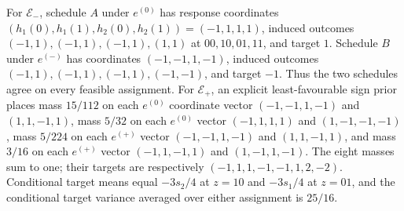 For \(\mathcal E_-\), schedule \(A\) under \(e^{(0)}\) has response coordinates \((h_{1}(0),h_{1}(1),h_{2}(0),h_{2}(1))=(-1,1,1,1)\), induced outcomes \((-1,1),(-1,1),(-1,1),(1,1)\) at \(00,10,01,11\), and target \(1\). Schedule \(B\) under \(e^{(-)}\) has coordinates \((-1,-1,1,-1)\), induced outcomes \((-1,1),(-1,1),(-1,1),(-1,-1)\), and target \(-1\). Thus the two schedules agree on every feasible assignment. For \(\mathcal E_+\), an explicit least-favourable sign prior places mass \(15/112\) on each \(e^{(0)}\) coordinate vector \((-1,-1,1,-1)\) and \((1,1,-1,1)\), mass \(5/32\) on each \(e^{(0)}\) vector \((-1,1,1,1)\) and \((1,-1,-1,-1)\), mass \(5/224\) on each \(e^{(+)}\) vector \((-1,-1,1,-1)\) and \((1,1,-1,1)\), and mass \(3/16\) on each \(e^{(+)}\) vector \((-1,1,-1,1)\) and \((1,-1,1,-1)\). The eight masses sum to one; their targets are respectively \((-1,1,1,-1,-1,1,2,-2)\). Conditional target means equal \(-3s_2/4\) at \(z=10\) and \(-3s_1/4\) at \(z=01\), and the conditional target variance averaged over either assignment is \(25/16\).